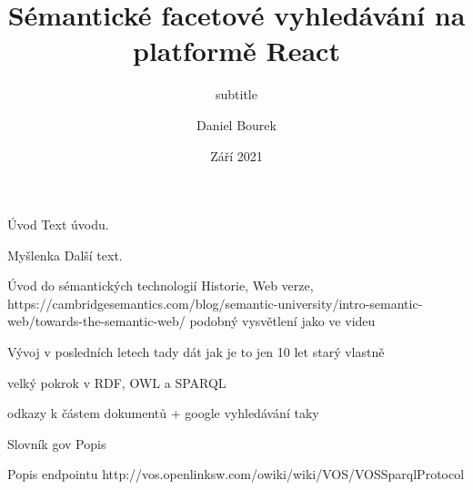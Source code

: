 

\worktype [O/CZ]

\title {Sémantické facetové vyhledávání na platformě React}
\subtitle {subtitle}

\author {Daniel Bourek}
\date {Září 2021}




\makefront

\chap Úvod
Text úvodu.

\sec Myšlenka
Další text.

\chap Úvod do sémantických technologií
\sec Historie, Web verze,
https://cambridgesemantics.com/blog/semantic-university/intro-semantic-web/towards-the-semantic-web/ podobný vysvětlení jako ve videu

\sec Vývoj v posledních letech
tady dát jak je to jen 10 let starý vlastně

velký pokrok v RDF, OWL a SPARQL

odkazy k částem dokumentů + google vyhledávání taky

\chap Slovník gov
\sec Popis

\sec Popis endpointu
http://vos.openlinksw.com/owiki/wiki/VOS/VOSSparqlProtocol


\bye